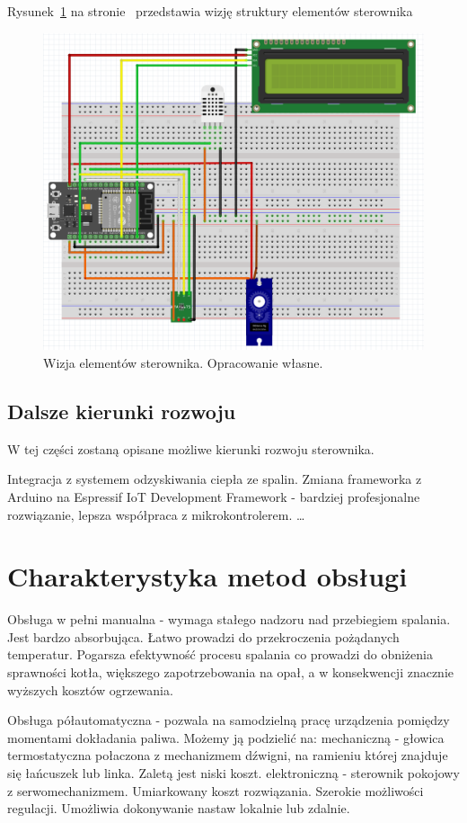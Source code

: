 \documentclass[12pt]{report}
\begin{document}
 Rysunek~\ref{fig:wizja} na stronie~\pageref{fig:wizja} przedstawia wizję struktury elementów sterownika
 \begin{figure}[ht]
\centering
\includegraphics[width=0.8 \textwidth]{fig/fritzing_bredboard_v1.png}
\caption{Wizja elementów sterownika. Opracowanie własne.}
\label{fig:wizja}
\end{figure}
 
 \section{Dalsze kierunki rozwoju}
 W tej części zostaną opisane możliwe kierunki rozwoju sterownika.
 
 Integracja z systemem odzyskiwania ciepła ze spalin.
 Zmiana frameworka z Arduino na Espressif IoT Development Framework - bardziej profesjonalne rozwiązanie, lepsza współpraca z mikrokontrolerem.
 \ldots
 

 \chapter{Charakterystyka metod obsługi} 
 Obsługa w pełni manualna - wymaga stałego nadzoru nad przebiegiem spalania. Jest bardzo absorbująca. Łatwo prowadzi do przekroczenia pożądanych temperatur. Pogarsza efektywność procesu spalania co prowadzi do obniżenia sprawności kotła, większego zapotrzebowania na opał, a w konsekwencji znacznie wyższych kosztów ogrzewania.
 
 Obsługa półautomatyczna - pozwala na samodzielną pracę urządzenia pomiędzy momentami dokładania paliwa. Możemy ją podzielić na:
 mechaniczną - głowica termostatyczna połaczona z mechanizmem dźwigni, na ramieniu której znajduje się łańcuszek lub linka. Zaletą jest niski koszt.
 elektroniczną - sterownik pokojowy z serwomechanizmem. Umiarkowany koszt rozwiązania. Szerokie możliwości regulacji. Umożliwia dokonywanie nastaw lokalnie lub zdalnie.
 
\end{document}

